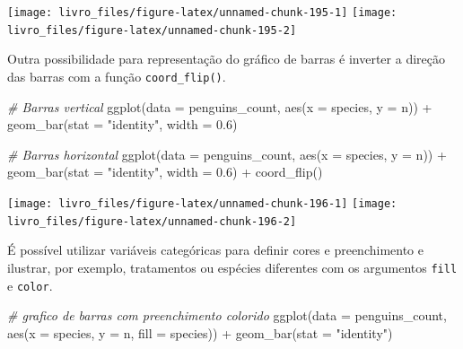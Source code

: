 \documentclass[
]{book}
\newenvironment{Shaded}{\begin{snugshade}}{\end{snugshade}}
\newcommand{\AttributeTok}[1]{\textcolor[rgb]{0.61,0.61,0.61}{#1}}
\newcommand{\CommentTok}[1]{\textcolor[rgb]{0.37,0.37,0.37}{\textit{#1}}}
\newcommand{\FloatTok}[1]{\textcolor[rgb]{0.06,0.06,0.06}{#1}}
\newcommand{\FunctionTok}[1]{\textcolor[rgb]{0,0,0}{#1}}
\newcommand{\NormalTok}[1]{#1}
\newcommand{\SpecialCharTok}[1]{\textcolor[rgb]{0,0,0}{#1}}
\newcommand{\StringTok}[1]{\textcolor[rgb]{0.5,0.5,0.5}{#1}}
\begin{document}
\begin{center}\texttt{[image: livro\_files/figure-latex/unnamed-chunk-195-1]} \texttt{[image: livro\_files/figure-latex/unnamed-chunk-195-2]} \end{center}

Outra possibilidade para representação do gráfico de barras é inverter a direção das barras com a função \texttt{coord\_flip()}.

\begin{Shaded}
\begin{Highlighting}[]

\CommentTok{\# Barras vertical}
\FunctionTok{ggplot}\NormalTok{(}\AttributeTok{data =}\NormalTok{ penguins\_count, }
       \FunctionTok{aes}\NormalTok{(}\AttributeTok{x =}\NormalTok{ species, }\AttributeTok{y =}\NormalTok{ n)) }\SpecialCharTok{+}
  \FunctionTok{geom\_bar}\NormalTok{(}\AttributeTok{stat =} \StringTok{"identity"}\NormalTok{,}
           \AttributeTok{width =} \FloatTok{0.6}\NormalTok{)}

\CommentTok{\# Barras horizontal}
\FunctionTok{ggplot}\NormalTok{(}\AttributeTok{data =}\NormalTok{ penguins\_count, }
       \FunctionTok{aes}\NormalTok{(}\AttributeTok{x =}\NormalTok{ species, }\AttributeTok{y =}\NormalTok{ n)) }\SpecialCharTok{+}
  \FunctionTok{geom\_bar}\NormalTok{(}\AttributeTok{stat =} \StringTok{"identity"}\NormalTok{,}
           \AttributeTok{width =} \FloatTok{0.6}\NormalTok{) }\SpecialCharTok{+} 
  \FunctionTok{coord\_flip}\NormalTok{()}
\end{Highlighting}
\end{Shaded}

\begin{center}\texttt{[image: livro\_files/figure-latex/unnamed-chunk-196-1]} \texttt{[image: livro\_files/figure-latex/unnamed-chunk-196-2]} \end{center}

É possível utilizar variáveis categóricas para definir cores e preenchimento e ilustrar, por exemplo, tratamentos ou espécies diferentes com os argumentos \texttt{fill} e \texttt{color}.

\begin{Shaded}
\begin{Highlighting}[]

\CommentTok{\# grafico de barras com preenchimento colorido}
\FunctionTok{ggplot}\NormalTok{(}\AttributeTok{data =}\NormalTok{ penguins\_count, }
       \FunctionTok{aes}\NormalTok{(}\AttributeTok{x =}\NormalTok{ species, }\AttributeTok{y =}\NormalTok{ n, }\AttributeTok{fill =}\NormalTok{ species)) }\SpecialCharTok{+}
  \FunctionTok{geom\_bar}\NormalTok{(}\AttributeTok{stat =} \StringTok{"identity"}\NormalTok{)}
\end{Highlighting}
\end{Shaded}
\end{document}
